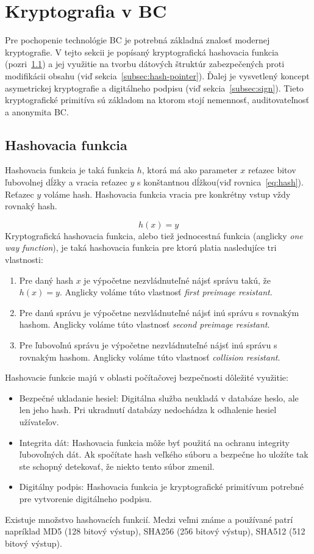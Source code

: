 \section{Kryptografia v BC}\label{sec:crypto}
Pre pochopenie technológie BC je potrebná základná znalosť modernej kryptografie. V tejto sekcii je popísaný kryptografická hashovacia funkcia (pozri~\ref{subsec:hash}) a jej využitie na tvorbu dátových štruktúr zabezpečených proti modifikácii obsahu (viď sekcia~\ref{subsec:hash-pointer}). Ďalej je vysvetlený koncept asymetrickej kryptografie a digitálneho podpisu (viď sekcia~\ref{subsec:sign}). Tieto kryptografické primitíva sú základom na ktorom stojí nemennosť, auditovateľnosť a anonymita BC.

\subsection{Hashovacia funkcia}\label{subsec:hash}
Hashovacia funkcia je taká funkcia $h$, ktorá má ako parameter $x$ reťazec bitov ľubovolnej dĺžky a vracia reťazec $y$ s konštantnou dĺžkou(viď rovnica~\ref{eq:hash}). Reťazec $y$ voláme hash. Hashovacia funkcia vracia pre konkrétny vstup vždy rovnaký hash.

\begin{equation} \label{eq:hash}
	h(x) = y
\end{equation}
Kryptografická hashovacia funkcia, alebo tiež jednocestná funkcia (anglicky \textit{one way function}), je taká hashovacia funkcia pre ktorú platia nasledujíce tri vlastnosti:
\begin{enumerate}
	\item Pre daný hash $x$ je výpočetne nezvládnuteľné nájsť správu takú, že $ h(x) = y $. Anglicky voláme túto vlastnosť \textit{first preimage resistant}.
	\item Pre danú správu je výpočetne nezvládnuteľné nájsť inú správu s rovnakým hashom. Anglicky voláme túto vlastnosť \textit{second preimage resistant}.
	\item Pre ľubovoľnú správu je výpočetne nezvládnuteľné nájsť inú správu s rovnakým hashom. Anglicky voláme túto vlastnosť \textit{collision resistant}.
\end{enumerate}

Hashovacie funkcie majú v oblasti počítačovej bezpečnosti dôležité využitie:
\begin{itemize}
	\item Bezpečné ukladanie hesiel: Digitálna služba neukladá v databáze heslo, ale len jeho hash. Pri ukradnutí databázy nedochádza k odhalenie hesiel užívateľov.
	\item Integrita dát: Hashovacia funkcia môže byť použitá na ochranu integrity ľubovoľných dát. Ak spočítate hash veľkého súboru a bezpečne ho uložíte tak ste schopný detekovať, že niekto tento súbor zmenil.
	\item Digitálny podpis: Hashovacia funkcia je kryptografické primitívum potrebné pre vytvorenie digitálneho podpisu.
\end{itemize}
Existuje množstvo hashovacích funkcií. Medzi veľmi známe a používané patrí napríklad MD5 (128 bitový výstup), SHA256 (256 bitový výstup), SHA512 (512 bitový výstup).~\cite{cryptoHandbook, nigelSmartCrypto}

